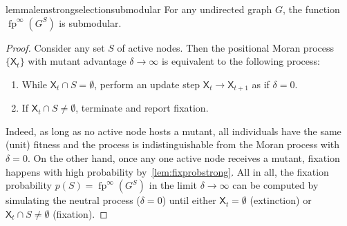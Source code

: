 \documentclass[letterpaper]{article}
\newcommand{\X}{\mathsf{X}}
\newcommand{\fp}{\operatorname{fp}}
\newcommand{\FitAdv}{\delta}
\begin{document}
\begin{restatable}[Submodularity]{lemma}{lemstrongselectionsubmodular}
\label{lem:strong_selection_submodular}
For any undirected graph $G$, the function $\fp^\infty(G^S)$ is submodular. 
\end{restatable}
\begin{proof}
Consider any set $S$ of active nodes.
Then the positional Moran process $\{\X_t\}$ with mutant advantage $\FitAdv\to\infty$ is equivalent to the following process:
\begin{enumerate}
\item While $\X_t\cap S=\emptyset$, perform an update step $\X_t\to\X_{t+1}$ as if $\FitAdv=0$.
\item If $\X_t\cap S\ne \emptyset$, terminate and report fixation.
\end{enumerate}
Indeed, as long as no active node hosts a mutant, all individuals have the same (unit) fitness and
the process is indistinguishable from the Moran process with $\FitAdv=0$.
On the other hand, once any one active node receives a mutant, fixation happens with high probability by~\cref{lem:fixprobstrong}.
All in all, the fixation probability $p(S)=\fp^{\infty}(G^S)$ in the limit $\FitAdv\to\infty$
can be computed by simulating the neutral process ($\FitAdv=0$) until
either $\X_t=\emptyset$ (extinction) or $\X_t\cap S\ne\emptyset$ (fixation).


\end{proof}
\end{document}
